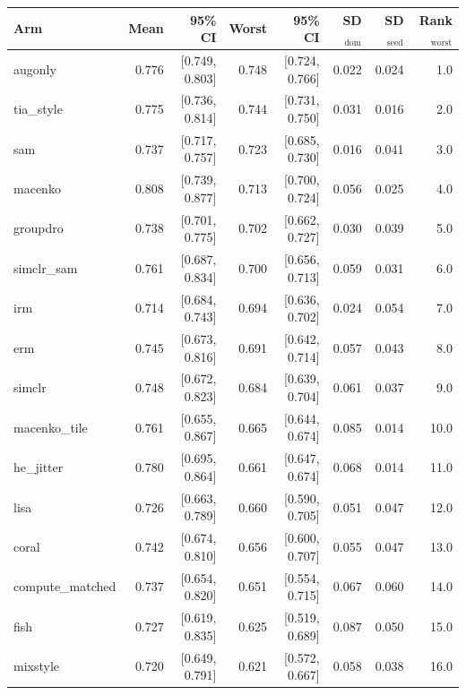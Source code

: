 \begin{tabular}{lrrrrrrr}
\toprule
Arm & Mean & 95\% CI & Worst & 95\% CI & SD$_\text{dom}$ & SD$_\text{seed}$ & Rank$_\text{worst}$ \\
\midrule
augonly & 0.776 & [0.749, 0.803] & 0.748 & [0.724, 0.766] & 0.022 & 0.024 & 1.0 \\
tia\_style & 0.775 & [0.736, 0.814] & 0.744 & [0.731, 0.750] & 0.031 & 0.016 & 2.0 \\
sam & 0.737 & [0.717, 0.757] & 0.723 & [0.685, 0.730] & 0.016 & 0.041 & 3.0 \\
macenko & 0.808 & [0.739, 0.877] & 0.713 & [0.700, 0.724] & 0.056 & 0.025 & 4.0 \\
groupdro & 0.738 & [0.701, 0.775] & 0.702 & [0.662, 0.727] & 0.030 & 0.039 & 5.0 \\
simclr\_sam & 0.761 & [0.687, 0.834] & 0.700 & [0.656, 0.713] & 0.059 & 0.031 & 6.0 \\
irm & 0.714 & [0.684, 0.743] & 0.694 & [0.636, 0.702] & 0.024 & 0.054 & 7.0 \\
erm & 0.745 & [0.673, 0.816] & 0.691 & [0.642, 0.714] & 0.057 & 0.043 & 8.0 \\
simclr & 0.748 & [0.672, 0.823] & 0.684 & [0.639, 0.704] & 0.061 & 0.037 & 9.0 \\
macenko\_tile & 0.761 & [0.655, 0.867] & 0.665 & [0.644, 0.674] & 0.085 & 0.014 & 10.0 \\
he\_jitter & 0.780 & [0.695, 0.864] & 0.661 & [0.647, 0.674] & 0.068 & 0.014 & 11.0 \\
lisa & 0.726 & [0.663, 0.789] & 0.660 & [0.590, 0.705] & 0.051 & 0.047 & 12.0 \\
coral & 0.742 & [0.674, 0.810] & 0.656 & [0.600, 0.707] & 0.055 & 0.047 & 13.0 \\
compute\_matched & 0.737 & [0.654, 0.820] & 0.651 & [0.554, 0.715] & 0.067 & 0.060 & 14.0 \\
fish & 0.727 & [0.619, 0.835] & 0.625 & [0.519, 0.689] & 0.087 & 0.050 & 15.0 \\
mixstyle & 0.720 & [0.649, 0.791] & 0.621 & [0.572, 0.667] & 0.058 & 0.038 & 16.0 \\
\bottomrule
\end{tabular}
